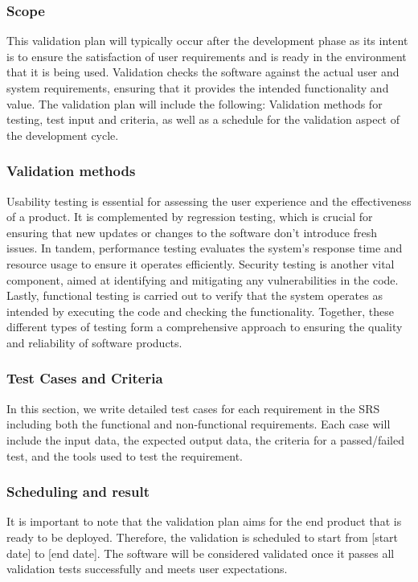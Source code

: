 \documentclass[12pt, titlepage]{article}
\begin{document}
\subsubsection{Scope}
This validation plan will typically occur after the development phase as its intent is to ensure the satisfaction of user requirements and is ready in the environment that it is being used. Validation checks the software against the actual user and system requirements, ensuring that it provides the intended functionality and value. The validation plan will include the following: Validation methods for testing, test input and criteria, as well as a schedule for the validation aspect of the development cycle.

\subsubsection{Validation methods}
Usability testing is essential for assessing the user experience and the effectiveness of a product. It is complemented by regression testing, which is crucial for ensuring that new updates or changes to the software don't introduce fresh issues. In tandem, performance testing evaluates the system's response time and resource usage to ensure it operates efficiently. Security testing is another vital component, aimed at identifying and mitigating any vulnerabilities in the code. Lastly, functional testing is carried out to verify that the system operates as intended by executing the code and checking the functionality. Together, these different types of testing form a comprehensive approach to ensuring the quality and reliability of software products.

\subsubsection{Test Cases and Criteria}
In this section, we write detailed test cases for each requirement in the SRS including both the functional and non-functional requirements. Each case will include the input data, the expected output data, the criteria for a passed/failed test, and the tools used to test the requirement.

\subsubsection{Scheduling and result}
It is important to note that the validation plan aims for the end product that is ready to be deployed. Therefore, the validation is scheduled to start from [start date] to [end date]. The software will be considered validated once it passes all validation tests successfully and meets user expectations.
\end{document}

